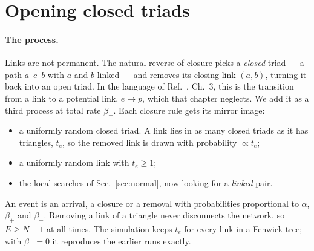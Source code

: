 \documentclass[aps,pre,twocolumn,superscriptaddress,floatfix,nofootinbib]{revtex4-2}
\begin{document}
\section{Opening closed triads}
\label{sec:opening}

\paragraph*{The process.}
Links are not permanent. The natural reverse of closure picks a \emph{closed}
triad --- a path $a$--$c$--$b$ with $a$ and $b$ linked --- and removes its
closing link $(a,b)$, turning it back into an open triad. In the language of
Ref.~\cite{book}, Ch.~3, this is the transition from a link to a potential link,
$e\to p$, which that chapter neglects. We add it as a third process at total
rate $\beta_-$. Each closure rule gets its mirror image:
\begin{itemize}
\item[(w)] a uniformly random closed triad. A link lies in as many closed
  triads as it has triangles, $t_e$, so the removed link is drawn with
  probability $\propto t_e$;
\item[(p)] a uniformly random link with $t_e\ge1$;
\item[(c), (f)] the local searches of Sec.~\ref{sec:normal}, now looking for a
  \emph{linked} pair.
\end{itemize}
An event is an arrival, a closure or a removal with probabilities proportional
to $\alpha$, $\beta_+$ and $\beta_-$. Removing a link of a triangle never
disconnects the network, so $E\ge N-1$ at all times. The simulation keeps
$t_e$ for every link in a Fenwick tree; with $\beta_-=0$ it reproduces the
earlier runs exactly.
\end{document}
